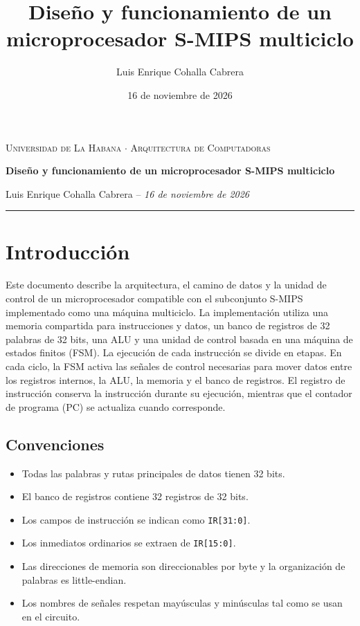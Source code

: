 \documentclass[11pt,a4paper]{article}
\title{\textbf{Diseño y funcionamiento de un microprocesador S-MIPS multiciclo}}
\author{Luis Enrique Cohalla Cabrera}
\date{16 de noviembre de 2026}
\begin{document}
\begin{center}
    {\small\scshape\color{UHred} Universidad de La Habana $\cdot$ Arquitectura de Computadoras}\par
    \vspace{0.45em}
    {\LARGE\bfseries\color{UHredDark} Diseño y funcionamiento de un microprocesador S-MIPS multiciclo}\par
    \vspace{0.35em}
    {\normalsize Luis Enrique Cohalla Cabrera \quad -- \quad \textit{16 de noviembre de 2026}}\par
    \vspace{0.5em}
    {\color{UHline}\rule{\textwidth}{0.6pt}}
\end{center}
\vspace{0.5em}

\section{Introducción}
Este documento describe la arquitectura, el camino de datos y la unidad de control de un microprocesador compatible con el subconjunto S-MIPS implementado como una máquina multiciclo. La implementación utiliza una memoria compartida para instrucciones y datos, un banco de registros de 32 palabras de 32 bits, una ALU y una unidad de control basada en una máquina de estados finitos (FSM).
La ejecución de cada instrucción se divide en etapas. En cada ciclo, la FSM activa las señales de control necesarias para mover datos entre los registros internos, la ALU, la memoria y el banco de registros. El registro de instrucción conserva la instrucción durante su ejecución, mientras que el contador de programa (PC) se actualiza cuando corresponde.

\subsection{Convenciones}
\begin{itemize}[nosep]
    \item Todas las palabras y rutas principales de datos tienen 32 bits.
    \item El banco de registros contiene 32 registros de 32 bits.
    \item Los campos de instrucción se indican como \texttt{IR[31:0]}.
    \item Los inmediatos ordinarios se extraen de \texttt{IR[15:0]}.
    \item Las direcciones de memoria son direccionables por byte y la organización de palabras es little-endian. \item Los nombres de señales respetan mayúsculas y minúsculas tal como se usan en el circuito.
\end{itemize}
\end{document}
